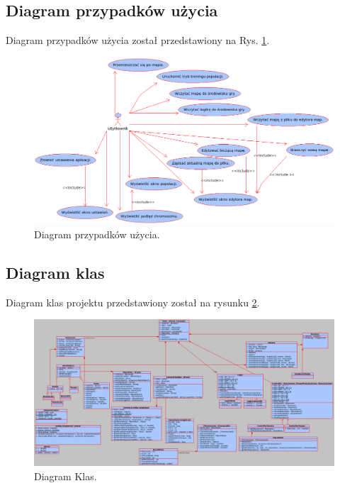 \subsection{Diagram przypadków użycia}
\begin{par}
	Diagram przypadków użycia został przedstawiony na Rys. \ref{fig:diagram_przypadkow}.
		\begin{figure}[!h]
		\centering
		\includegraphics[width=\textwidth]{obrazki/diagram_przypadkow.png}
		\caption{Diagram przypadków użycia.}
		\label{fig:diagram_przypadkow}
		\end{figure}
\end{par}

\subsection{Diagram klas}
\begin{par}
	\begin{par}
	Diagram klas projektu przedstawiony został na rysunku \ref{fig:diagram_klas}.
	\end{par}
	\begin{figure}[!h]
	\centering
	\includegraphics[width=\textwidth]{obrazki/diagram_klas.png}
	\caption{Diagram Klas.}
	\label{fig:diagram_klas}
	\end{figure}
\end{par}


